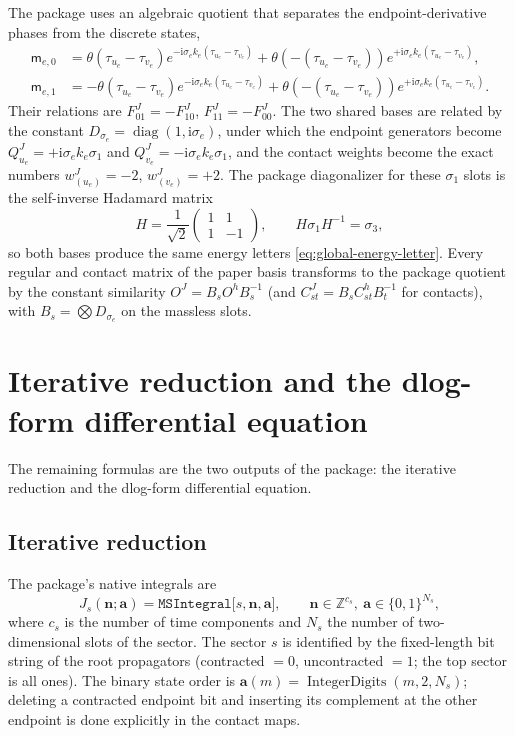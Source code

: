 \documentclass[11pt,a4paper]{article}
\newcommand{\ii}{\mathrm i}
\newcommand{\diag}{\operatorname{diag}}
\begin{document}
The package uses an algebraic quotient that separates the endpoint-derivative phases from the
discrete states,
\begin{align}
  \mathsf m_{e,0}
  &=\theta(\tau_{u_e}-\tau_{v_e})
    e^{-\ii\sigma_ek_e(\tau_{u_e}-\tau_{v_e})}
    +\theta(-(\tau_{u_e}-\tau_{v_e}))
    e^{+\ii\sigma_ek_e(\tau_{u_e}-\tau_{v_e})},\\
  \mathsf m_{e,1}
  &=-\theta(\tau_{u_e}-\tau_{v_e})
    e^{-\ii\sigma_ek_e(\tau_{u_e}-\tau_{v_e})}
    +\theta(-(\tau_{u_e}-\tau_{v_e}))
    e^{+\ii\sigma_ek_e(\tau_{u_e}-\tau_{v_e})}.
\end{align}
Their relations are $F^J_{01}=-F^J_{10}$, $F^J_{11}=-F^J_{00}$. The two shared bases are related by
the constant $D_{\sigma_e}=\diag(1,\ii\sigma_e)$, under which the endpoint generators become
$Q^J_{u_e}=+\ii\sigma_ek_e\sigma_1$ and $Q^J_{v_e}=-\ii\sigma_ek_e\sigma_1$, and the contact weights
become the exact numbers $w^J_{(u_e)}=-2$, $w^J_{(v_e)}=+2$. The package diagonalizer for these
$\sigma_1$ slots is the self-inverse Hadamard matrix
\begin{equation}
  H=\frac1{\sqrt2}\begin{pmatrix}1&1\\1&-1\end{pmatrix},
  \qquad
  H\sigma_1H^{-1}=\sigma_3,
\end{equation}
so both bases produce the same energy letters \eqref{eq:global-energy-letter}. Every regular and
contact matrix of the paper basis transforms to the package quotient by the constant similarity
$O^J=B_sO^hB_s^{-1}$ (and $C^J_{st}=B_sC^h_{st}B_t^{-1}$ for contacts), with
$B_s=\bigotimes D_{\sigma_e}$ on the massless slots.

\section{Iterative reduction and the dlog-form differential equation}
\label{sec:reduction}

The remaining formulas are the two outputs of the package: the iterative reduction and the
dlog-form differential equation.

\subsection{Iterative reduction}

The package's native integrals are
\begin{equation}
  J_s(\bm n;\bm a)=\texttt{MSIntegral[}s,\bm n,\bm a\texttt{]},
  \qquad \bm n\in\mathbb Z^{c_s},\ \bm a\in\{0,1\}^{N_s},
  \label{eq:MSIntegral-domain}
\end{equation}
where $c_s$ is the number of time components and $N_s$ the number of two-dimensional slots of the
sector. The sector $s$ is identified by the fixed-length bit string of the root propagators
(contracted $=0$, uncontracted $=1$; the top sector is all ones). The binary state order is
$\bm a(m)=\operatorname{IntegerDigits}(m,2,N_s)$; deleting a contracted endpoint bit and inserting
its complement at the other endpoint is done explicitly in the contact maps.
\end{document}
